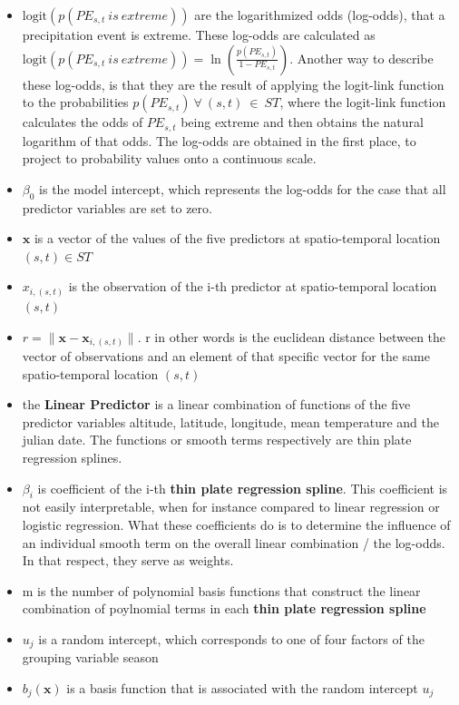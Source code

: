 \documentclass[
  12pt,
]{article}
\begin{document}
\begin{itemize}[label={}]
\item $\text{logit}(p(PE_{s,t}\:is\:extreme))$ are the logarithmized odds (log-odds), that a precipitation event is extreme. These log-odds are calculated as $\text{logit}(p(PE_{s,t}\:is\:extreme))=\ln\left(\frac{p(PE_{s,t})}{1-PE_{s,t}}\right)$. Another way to describe these log-odds, is that they are the result of applying the logit-link function to the probabilities $p(PE_{s,t})\:\forall\:(s,t)\:\in\:ST$, where the logit-link function calculates the odds of $PE_{s,t}$ being extreme and then obtains the natural logarithm of that odds. The log-odds are obtained in the first place, to project to probability values onto a continuous scale.
\item $\beta_{0}$ is the model intercept, which represents the log-odds for the case that all predictor variables are set to zero.
    \item $\boldsymbol{x}$ is a vector of the values of the five predictors at spatio-temporal location $(s,t)\in ST$
    \item $x_{i,(s,t)}$ is the observation of the i-th predictor at spatio-temporal location $(s,t)$
    \item $r=\lVert \boldsymbol{x} - \boldsymbol{x}_{i,(s,t)} \rVert$. r in other words is the euclidean distance between the vector of observations and an element of that specific vector for the same spatio-temporal location $(s,t)$
    \item the \textbf{Linear Predictor} is a linear combination of functions of the five predictor variables altitude, latitude, longitude, mean temperature and the julian date. The functions or smooth terms respectively are thin plate regression splines. 
    \item $\beta_i$ is coefficient of the i-th \textbf{thin plate regression spline}. This coefficient is not easily interpretable, when for instance compared to linear regression or logistic regression. What these coefficients do is to determine the influence of an individual smooth term on the overall linear combination / the log-odds. In that respect, they serve as weights. 
    \item m is the number of polynomial basis functions that construct the linear combination of poylnomial terms in each \textbf{thin plate regression spline}
    \item $u_j$ is a random intercept, which corresponds to one of four factors of the grouping variable season  
    \item $b_j(\boldsymbol{x})$ is a basis function that is associated with the random intercept $u_j$

\end{itemize}
\end{document}
